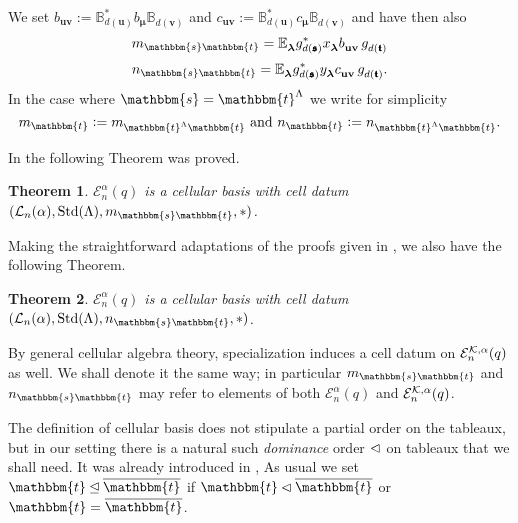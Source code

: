 \documentclass[10pt,a4,twoside,hidelinks,rm]{article}
\newcommand{\BB}{\mathbb{B}}
\newcommand\es{\mathbbm{s}}
\newcommand\et{\mathbbm{t}}
\newcommand\bu{\mathbf{u}}
\newcommand\bv{\mathbf{v}}
\newcommand{\T}{\mathfrak{t}}
\newcommand{\bT}{\pmb{\mathfrak{t}}}
\newcommand{\Bs}{\pmb{\mathfrak{s}}}
\newcommand{\std}{{\rm Std}}
\newcommand{\Tab}{{\rm Tab}}
\newcommand{\Ea}{ {\mathcal E}_n^{\alpha}(q)}
\newcommand{\Eak}{ {\mathcal E}_n^{ {\cal K}, \alpha}(q)}
\newcommand\blambda{{\boldsymbol\lambda}}
\newcommand\be{\mathbb{E}}
\newcommand\bmu{{\boldsymbol\mu}}
\theoremstyle{plain}
\newtheorem{teo}{Theorem}%
\begin{document}
\medskip
\noindent
We set $  b^{}_{\bu \bv} :=  \BB_{d(\bu)}^{\ast}   b^{}_{\bmu}\BB^{}_{d(\bv)} $ 
and $  c^{}_{\bu \bv} :=  \BB_{d(\bu)}^{\ast}   c^{}_{\bmu}\BB^{}_{d(\bv)} $ and have then also
\begin{equation}
m_{\es\et}=   { \be}^{}_{\blambda} g_{d(\Bs)}^{\ast}  x^{}_{\blambda} b^{}_{\bu \bv} \,
g^{}_{d(\bT)}
\end{equation}
\begin{equation}
n_{\es\et}=   { \be}^{}_{\blambda} g_{d(\Bs)}^{\ast}  y^{}_{\blambda} c^{}_{\bu \bv} \,
g^{}_{d(\bT)}.
\end{equation}
In the case where $ \es = \et^{\Lambda} $ we write for simplicity
\begin{equation}\label{forsimplicity}
m_{\et} :=   m_{\et^{\Lambda} \et}  \mbox{  and  } 
n_{\et} :=   n_{\et^{\Lambda} \et}.
\end{equation}






In \cite{ER} the following Theorem was proved. 
\begin{teo}
$ \Ea $ is a cellular basis with cell datum $ ({\cal L}_n(\alpha), \std(\Lambda), m_{\es\et}, \ast)$.
\end{teo}  

Making the straightforward adaptations of the proofs given in \cite{ER}, we also have
the following Theorem.
\begin{teo}
$ \Ea $ is a cellular basis with cell datum $ ({\cal L}_n(\alpha), \std(\Lambda), n_{\es\et}, \ast)$.
\end{teo}  

By general cellular algebra theory, specialization induces a cell datum on 
$ \Eak$ as well. We shall denote it the same way; in particular $ m_{\es\et} $ and $  n_{\es\et} $
may refer to elements
of both $ \Ea $ and $ \Eak$. 


The definition of cellular basis does not stipulate a partial order on the tableaux, but
in our setting there is a natural such {\color{black} \textit{dominance}} order $\color{black}{ \lhd}$
on tableaux
that we shall need. 
It was already introduced in \cite{ER}, {}
As usual we set $ \et \unlhd \overline{\et} $ if $ \et \lhd \overline{\et} $ or
$ \et = \overline{\et} $.
\end{document}
